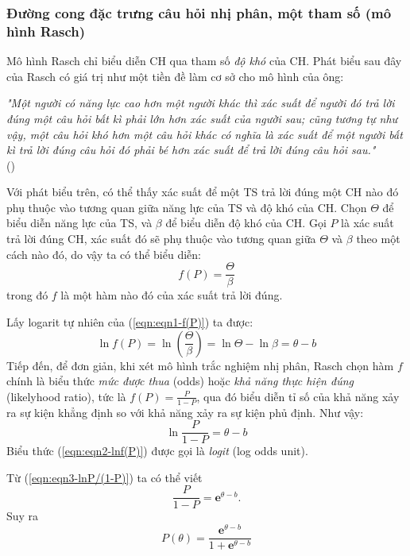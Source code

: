 \subsubsection{Đường cong đặc trưng câu hỏi nhị phân, một tham số (mô hình Rasch)}
Mô hình Rasch chỉ biểu diễn CH qua tham số \textit{độ khó} của CH. Phát biểu sau đây của Rasch có giá trị như một tiền đề làm cơ sở cho mô hình của ông:
\begin{flushright}
\textit{"Một người có năng lực cao hơn một người khác thì xác suất để người đó trả lời đúng một câu hỏi bất kì phải lớn hơn xác suất của người sau; cũng tương tự như vậy, một câu hỏi khó hơn một câu hỏi khác có nghĩa là xác suất để một người bất kì trả lời đúng câu hỏi đó phải bé hơn xác suất để trả lời đúng câu hỏi sau."}\\(\cite{rasch1993probabilistic})
\end{flushright}
Với phát biểu trên, có thể thấy xác suất để một TS trả lời đúng một CH nào đó phụ thuộc vào tương quan giữa năng lực của TS và độ khó của CH. Chọn $\Theta$ để biểu diễn năng lực của TS, và $\beta$ để biểu diễn độ khó của CH. Gọi $P$ là xác suất trả lời đúng CH, xác suất đó sẽ phụ thuộc vào tương quan giữa $\Theta$ và $\beta$ theo một cách nào đó, do vậy ta có thể biểu diễn:
\begin{equation}\label{eqn:eqn1-f(P)}
	f(P)=\frac{\Theta}{\beta}
\end{equation}
trong đó $f$ là một hàm nào đó của xác suất trả lời đúng.\par
Lấy logarit tự nhiên của (\ref{eqn:eqn1-f(P)}) ta được:
\begin{equation}\label{eqn:eqn2-lnf(P)}
	\ln f(P)=\ln\left(\frac{\Theta}{\beta}\right)=\ln\Theta-\ln\beta=\theta-b
\end{equation}
Tiếp đến, để đơn giản, khi xét mô hình trắc nghiệm nhị phân, Rasch chọn hàm $f$ chính là biểu thức \textit{mức được thua} (odds) hoặc \textit{khả năng thực hiện đúng} (likelyhood ratio), tức là $f(P)=\frac{P}{1-P}$, qua đó biểu diễn tỉ số của khả năng xảy ra sự kiện khẳng định so với khả năng xảy ra sự kiện phủ định. Như vậy:
\begin{equation}\label{eqn:eqn3-lnP/(1-P)}
	\ln\frac{P}{1-P}=\theta-b
\end{equation}
Biểu thức (\ref{eqn:eqn2-lnf(P)}) được gọi là \textit{logit} (log odds unit).\par
Từ (\ref{eqn:eqn3-lnP/(1-P)}) ta có thể viết $$\frac{P}{1-P}=\mathbf{e}^{\theta-b}.$$
Suy ra
\begin{equation}\label{eqn:eqn4-P(theta)}
	P(\theta)=\frac{\mathbf{e}^{\theta-b}}{1+\mathbf{e}^{\theta-b}}
\end{equation}
